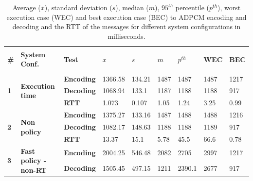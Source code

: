 \begin{table}[!hbtp]
\centering
\caption{Average ($\overline{x}$), standard deviation ($s$), median ($m$), $95^{th}$ percentile ($p^{th}$), worst execution case (WEC) and best execution case (BEC) to ADPCM encoding and decoding and the RTT of the messages for different system configurations in milliseconds.}
\label{table:rtsystem}
\begin{tabular}{lllllllll}
\hline \hline \\
\textbf{\#}                 & \textbf{System Conf.}                                   & \textbf{Test}     & \textbf{$\overline{x}$} & \textbf{$s$} & \textbf{$m$} & \textbf{$p^{th}$} & \textbf{WEC} & \textbf{BEC} \\ \\ \hline
\multirow{3}{*}{\textbf{1}} & \multirow{3}{*}{\textbf{Execution time}} & \textbf{Encoding} & 1366.58    & 134.21     & 1487       & 1487       & 1487        & 1217        \\
                            &                                                     & \textbf{Decoding} & 1068.94    & 133.1      & 1187       & 1188       & 1188        & 917  \\       
                            &                                                     & \textbf{RTT}      &  1.073 &   0.107 &    1.05 &   1.24     & 3.25   & 0.99                       \\  \hline            
\multirow{3}{*}{\textbf{2}} & \multirow{3}{*}{\textbf{Non policy}}                & \textbf{Encoding} & 1375.27    & 133.16     & 1487       & 1488       & 1488        & 1216        \\
                            &                                                     & \textbf{Decoding} & 1082.17    & 148.63     & 1188       & 1188       & 1189        & 917         \\
                            &                                                     & \textbf{RTT} & 13.37      & 15.1       & 5.78       & 45.5       & 66.6        & 0.78        \\ \hline
\multirow{3}{*}{\textbf{3}} & \multirow{3}{*}{\textbf{Fast policy - non-RT}}        & \textbf{Encoding} & 2004.25    & 546.48     & 2082       & 2705       & 2997        & 1217        \\
                            &                                                     & \textbf{Decoding} & 1505.45    & 497.15     & 1211       & 2390.1     & 2677        & 917         \\

\end{tabular}
\end{table}
